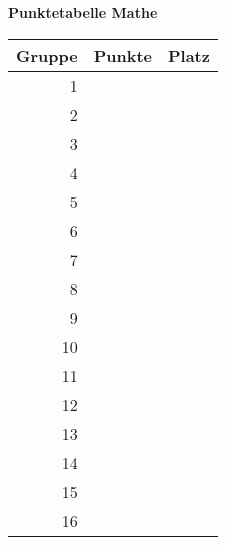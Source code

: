 \documentclass[a4paper,10pt]{article}
\begin{document}
\begin{center}
 {\Huge \textbf{Punktetabelle Mathe}} \vspace{2cm} \\
 \LARGE
 \begin{tabular}{|r|l|l|}
  \hline
  Gruppe & Punkte & Platz  \\ \hline
  1 &\hspace{5cm} & \hspace{3cm}\\ \hline 
  2 &\hspace{5cm} & \hspace{3cm}\\ \hline
  3 &\hspace{5cm} & \hspace{3cm}\\ \hline
  4 &\hspace{5cm} & \hspace{3cm}\\ \hline
  5 &\hspace{5cm} & \hspace{3cm}\\ \hline
  6 &\hspace{5cm} & \hspace{3cm}\\ \hline
  7 &\hspace{5cm} & \hspace{3cm}\\ \hline
  8 &\hspace{5cm} & \hspace{3cm}\\ \hline
  9 &\hspace{5cm} & \hspace{3cm}\\ \hline 
  10 &\hspace{5cm} & \hspace{3cm}\\ \hline
  11 &\hspace{5cm} & \hspace{3cm}\\ \hline
  12 &\hspace{5cm} & \hspace{3cm}\\ \hline
  13 &\hspace{5cm} & \hspace{3cm}\\ \hline
  14 &\hspace{5cm} & \hspace{3cm}\\ \hline
  15 &\hspace{5cm} & \hspace{3cm}\\ \hline
  16 &\hspace{5cm} & \hspace{3cm}\\ \hline
 \end{tabular}

\end{center}
\end{document}
